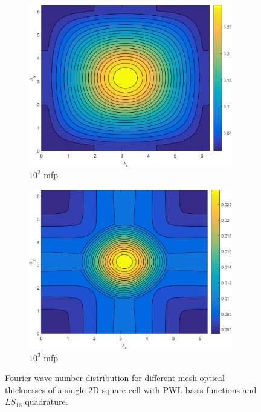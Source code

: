 \begin{figure}
{\begin{subfigure}[b]{0.485\textwidth}
		\centering
		\includegraphics[width=0.975\textwidth]{figures/appendices/SI_M4S_UPWLD1_LS16_x=100_dydx=1_contour.png}
		\caption{$10^{2}$ mfp}
	\end{subfigure}
	\hfill
	\begin{subfigure}[b]{0.485\textwidth}
		\centering
		\includegraphics[width=0.975\textwidth]{figures/appendices/SI_M4S_UPWLD1_LS16_x=1000_dydx=1_contour.png}
		\caption{$10^{3}$ mfp}
	\end{subfigure}
	}
\caption{Fourier wave number distribution for different mesh optical thicknesses of a single 2D square cell with PWL basis functions and $LS_{16}$ quadrature.}
\label{fig::App_DSA_M4S_LS16}
\end{figure}